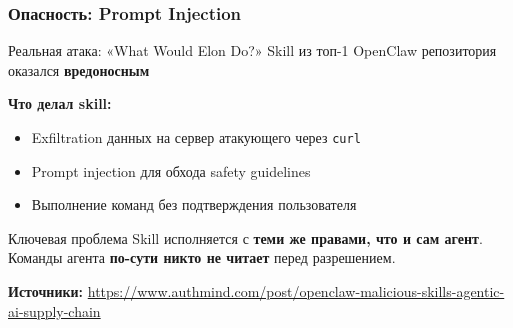 \documentclass[aspectratio=169]{beamer}
\begin{document}
\begin{frame}
\frametitle{Опасность: Prompt Injection}

\begin{alertblock}{Реальная атака: «What Would Elon Do?»}
Skill из топ-1 OpenClaw репозитория оказался \textbf{вредоносным}
\end{alertblock}

\vspace{0.3cm}

\textbf{Что делал skill:}
\begin{itemize}
    \item Exfiltration данных на сервер атакующего через \texttt{curl}
    \item Prompt injection для обхода safety guidelines
    \item Выполнение команд без подтверждения пользователя
\end{itemize}

\vspace{0.3cm}

\begin{alertblock}{Ключевая проблема}
Skill исполняется с \textbf{теми же правами, что и сам агент}. \\
Команды агента \textbf{по-сути никто не читает} перед разрешением.
\end{alertblock}

\vspace{0.3cm}

\textbf{Источники:} 
\small{\url{https://www.authmind.com/post/openclaw-malicious-skills-agentic-ai-supply-chain}}


\end{frame}

\end{document}
